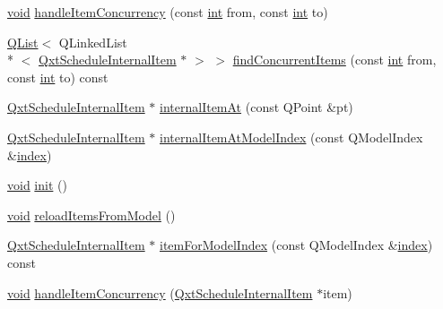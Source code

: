 \begin{DoxyCompactItemize}
\item 
\hyperlink{group___u_a_v_objects_plugin_ga444cf2ff3f0ecbe028adce838d373f5c}{void} \hyperlink{class_qxt_schedule_view_private_a6205ab248bb5dd09bcc836ce47ff0b48}{handle\-Item\-Concurrency} (const \hyperlink{ioapi_8h_a787fa3cf048117ba7123753c1e74fcd6}{int} from, const \hyperlink{ioapi_8h_a787fa3cf048117ba7123753c1e74fcd6}{int} to)
\item 
\hyperlink{class_q_list}{Q\-List}$<$ Q\-Linked\-List\\*
$<$ \hyperlink{class_qxt_schedule_internal_item}{Qxt\-Schedule\-Internal\-Item} $\ast$ $>$ $>$ \hyperlink{class_qxt_schedule_view_private_ac0f8ef451a8c9f9ed51cb3d1b80a05dd}{find\-Concurrent\-Items} (const \hyperlink{ioapi_8h_a787fa3cf048117ba7123753c1e74fcd6}{int} from, const \hyperlink{ioapi_8h_a787fa3cf048117ba7123753c1e74fcd6}{int} to) const 
\item 
\hyperlink{class_qxt_schedule_internal_item}{Qxt\-Schedule\-Internal\-Item} $\ast$ \hyperlink{class_qxt_schedule_view_private_a312d43b8daee1f72ada1f3cc0ca1aa38}{internal\-Item\-At} (const Q\-Point \&pt)
\item 
\hyperlink{class_qxt_schedule_internal_item}{Qxt\-Schedule\-Internal\-Item} $\ast$ \hyperlink{class_qxt_schedule_view_private_a782741a65db619eb44e20511f95f9c57}{internal\-Item\-At\-Model\-Index} (const Q\-Model\-Index \&\hyperlink{glext_8h_ab47dd9958bcadea08866b42bf358e95e}{index})
\item 
\hyperlink{group___u_a_v_objects_plugin_ga444cf2ff3f0ecbe028adce838d373f5c}{void} \hyperlink{class_qxt_schedule_view_private_a650cf638fab902542ca94260d0b1368b}{init} ()
\item 
\hyperlink{group___u_a_v_objects_plugin_ga444cf2ff3f0ecbe028adce838d373f5c}{void} \hyperlink{class_qxt_schedule_view_private_a96140a8dacd9021c56229fd6c1978552}{reload\-Items\-From\-Model} ()
\item 
\hyperlink{class_qxt_schedule_internal_item}{Qxt\-Schedule\-Internal\-Item} $\ast$ \hyperlink{class_qxt_schedule_view_private_a66caf3592371aa8d0dfb4d52f24aea1c}{item\-For\-Model\-Index} (const Q\-Model\-Index \&\hyperlink{glext_8h_ab47dd9958bcadea08866b42bf358e95e}{index}) const 
\item 
\hyperlink{group___u_a_v_objects_plugin_ga444cf2ff3f0ecbe028adce838d373f5c}{void} \hyperlink{class_qxt_schedule_view_private_a88fba5a45801b0ca0692ae52cdce2ec2}{handle\-Item\-Concurrency} (\hyperlink{class_qxt_schedule_internal_item}{Qxt\-Schedule\-Internal\-Item} $\ast$item)
\end{DoxyCompactItemize}

